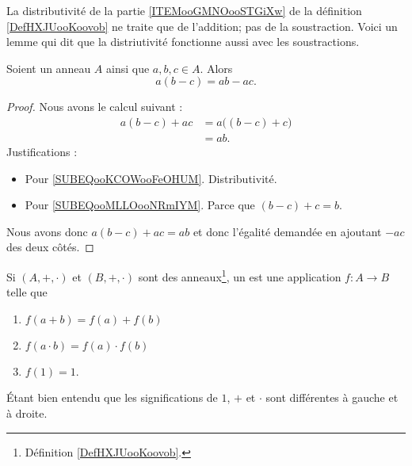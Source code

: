 \begin{normaltext}	\label{NORooDistributiviteSoustraction}
	La distributivité de la partie \ref{ITEMooGMNOooSTGiXw} de la définition \ref{DefHXJUooKoovob} ne traite que de l'addition; pas de la soustraction. Voici un lemme qui dit que la distriutivité fonctionne aussi avec les soustractions.
\end{normaltext}

\begin{lemma}     \label{LEMooVPYUooRzexke}
	Soient un anneau \( A\) ainsi que \( a,b,c\in A\). Alors
	\begin{equation}
		a(b-c)=ab-ac.
	\end{equation}
\end{lemma}

\begin{proof}
	Nous avons le calcul suivant :
	\begin{subequations}
		\begin{align}
			a(b-c)+ac & =a\big( (b-c)+c \big)     \label{SUBEQooKCOWooFeOHUM} \\
			          & =ab.       \label{SUBEQooMLLOooNRmIYM}
		\end{align}
	\end{subequations}
	Justifications :
	\begin{itemize}
		\item Pour \ref{SUBEQooKCOWooFeOHUM}. Distributivité.
		\item Pour \ref{SUBEQooMLLOooNRmIYM}. Parce que \( (b-c)+c=b\).
	\end{itemize}
	Nous avons donc \( a(b-c)+ac=ab\) et donc l'égalité demandée en ajoutant \( -ac\) des deux côtés.
\end{proof}


\begin{definition}      \label{DEFooSPHPooCwjzuz}
	Si \( (A,+,\cdot)\) et \( (B,+,\cdot)\) sont des anneaux\footnote{Définition \ref{DefHXJUooKoovob}.}, un  est une application \( f\colon A\to B\) telle que
	\begin{enumerate}
		\item \( f(a+b)=f(a)+f(b)\)
		\item \( f(a\cdot b)=f(a)\cdot f(b)\)
		\item \( f(1)=1\).
	\end{enumerate}
	Étant bien entendu que les significations de \( 1\), \( +\) et \( \cdot\) sont différentes à gauche et à droite.
\end{definition}


